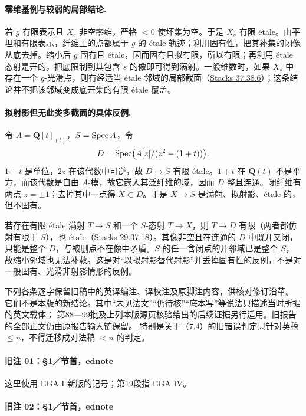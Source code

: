 \paragraph{零维基例与较弱的局部结论.}
若 $g$ 有限表示且 $X_s$ 非空零维，严格 $<0$ 使坏集为空。于是 $X_s$ 有限 étale。由平坦和有限表示，纤维上的点都属于 $g$ 的 étale 轨迹；利用固有性，把其补集的闭像从底去掉。缩小后 $g$ 固有且 étale，因而固有且拟有限，所以有限；再利用 étale 态射是开的，把底限制到其包含 $s$ 的像即可得到满射。一般维数时，如果 $X_s$ 中存在一个 $g$-光滑点，则有经适当 étale 邻域的局部截面（\href{https://stacks.math.columbia.edu/tag/055U}{Stacks 37.38.6}）；这条结论并不把该邻域变成底开集的有限 étale 覆盖。


\paragraph{拟射影但无此类多截面的具体反例.}
令 $A=\mathbf Q[t]_{(t)}$，$S=\operatorname{Spec} A$，令
\[
 D=\operatorname{Spec}\bigl(A[z]/(z^2-(1+t))\bigr).
\]
$1+t$ 是单位，$2z$ 在该代数中可逆，故 $D\to S$ 有限 étale。$1+t$ 在 $\mathbf Q(t)$ 不是平方，而该代数是自由 $A$-模，故它嵌入其泛纤维的域，因而 $D$ 整且连通。闭纤维有两点 $z=\pm1$；去掉其中一点得 $X\subset D$。于是 $X\to S$ 是满射、拟射影、étale 的，但不固有。

若存在有限 étale 满射 $T\to S$ 和一个 $S$-态射 $T\to X$，则 $T\to D$ 有限（两者都仿射有限于 $S$），也 étale（\href{https://stacks.math.columbia.edu/tag/0HB1}{Stacks 29.37.18}）。其像非空且在连通的 $D$ 中既开又闭，只能是整个 $D$，与被删点不在像中矛盾。$S$ 的任一含闭点的开邻域已是整个 $S$，故缩小邻域也无法补救。这是对“以拟射影替代射影”并丢掉固有性的反例，不是对一般固有、光滑非射影情形的反例。

\endgroup



下列各条逐字保留旧稿中的英译编注、译校注及原脚注内容，供核对修订沿革。
它们不是本版的新结论。其中“未见法文”“仍待核”“底本写”等说法只描述当时所据的英文载体；
第88—99批及上列本版源页核验给出的后续证据另行适用。旧报告的全部正文仍由原报告输入链保留。
特别是关于（7.4）的旧错误判定只针对英稿 $\le n$，不得迁移成对法稿 $<n$ 的判定。

\paragraph{旧注 01：§1／节首，ednote}

这里使用 EGA I 新版的记号；第19段指 EGA IV。

\paragraph{旧注 02：§1／节首，ednote}

